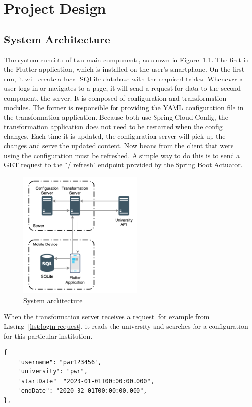 \chapter{Project Design}
\section{System Architecture}

The system consists of two main components, as shown in Figure~\ref{fig:sys-architecture}. The first is the Flutter application, which is installed on the user's smartphone. On the first run, it will create a local SQLite database with the required tables. Whenever a user logs in or navigates to a page, it will send a request for data to the second component, the server. It is composed of configuration and transformation modules. The former is responsible for providing the YAML configuration file in the transformation application. Because both use Spring Cloud Config, the transformation application does not need to be restarted when the config changes. Each time it is updated, the configuration server will pick up the changes and serve the updated content. Now beans from the client that were using the configuration must be refreshed. A simple way to do this is to send a GET request to the "/ refresh" endpoint provided by the Spring Boot Actuator.

\begin{figure}[htb]
    \centering
    \includegraphics[width=0.55\textwidth]{fig03/system_architecture.png}
    \caption{System architecture}
    \label{fig:sys-architecture}
\end{figure}

When the transformation server receives a request, for example from Listing~\ref{list:login-request}, it reads the university and searches for a configuration for this particular institution.
\begin{lstlisting}[label=list:login-request,caption=Sample calendar request, basicstyle=\footnotesize\ttfamily]
{
    "username": "pwr123456",
    "university": "pwr",
    "startDate": "2020-01-01T00:00:00.000",
    "endDate": "2020-02-01T00:00:00.000",
},
\end{lstlisting}

